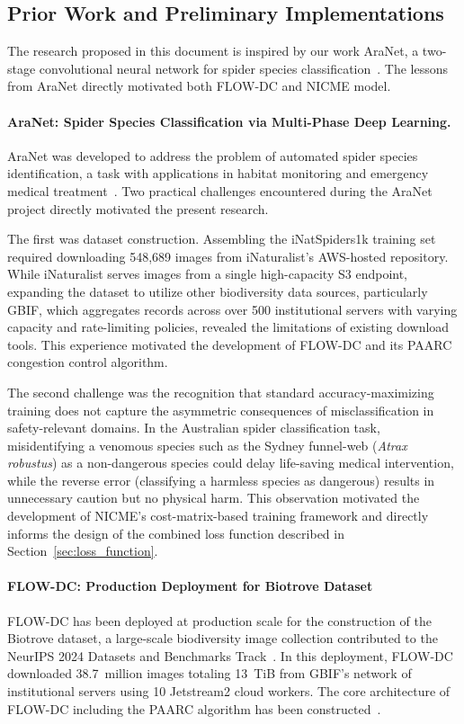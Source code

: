 \documentclass[11pt, letterpaper]{article}
\begin{document}
\subsection{Prior Work and Preliminary Implementations}
\label{sec:preliminary}

The research proposed in this document is inspired by our work AraNet, a two-stage convolutional neural network for spider species
classification~\cite{deng2026aranet}. The lessons from AraNet directly motivated both FLOW-DC and NICME model.

\paragraph{AraNet: Spider Species Classification via Multi-Phase Deep Learning.}
AraNet was developed to address the problem of automated spider species
identification, a task with applications in habitat monitoring and emergency
medical treatment~\cite{deng2026aranet}. Two practical challenges encountered during the AraNet project directly
motivated the present research.

The first was dataset construction. Assembling
the iNatSpiders1k training set required downloading 548,689 images from
iNaturalist's AWS-hosted repository. While iNaturalist serves images from a
single high-capacity S3 endpoint, expanding the dataset to utilize other biodiversity
data sources, particularly GBIF, which aggregates records across over 500
institutional servers with varying capacity and rate-limiting
policies, revealed the limitations of existing download tools. This experience
motivated the development of FLOW-DC and its PAARC congestion control algorithm.

The second challenge was the recognition that standard accuracy-maximizing
training does not capture the asymmetric consequences of misclassification in
safety-relevant domains. In the Australian spider classification task,
misidentifying a venomous species such as the Sydney funnel-web
(\textit{Atrax robustus}) as a non-dangerous species could delay life-saving
medical intervention, while the reverse error (classifying a harmless species
as dangerous) results in unnecessary caution but no physical harm.
This observation motivated the development of NICME's cost-matrix-based training framework and directly
informs the design of the combined loss function described in
Section~\ref{sec:loss_function}.

\paragraph{FLOW-DC: Production Deployment for Biotrove Dataset}
FLOW-DC has been deployed at production scale for the construction of the
Biotrove dataset, a large-scale biodiversity image collection contributed to the
NeurIPS 2024 Datasets and Benchmarks Track~\cite{yang2024biotrove}. In this
deployment, FLOW-DC downloaded 38.7~million images totaling 13~TiB from GBIF's
network of institutional servers using 10 Jetstream2 cloud workers. The core architecture of FLOW-DC including the PAARC algorithm has been constructed~\cite{deng2025flowdc}.
\end{document}
